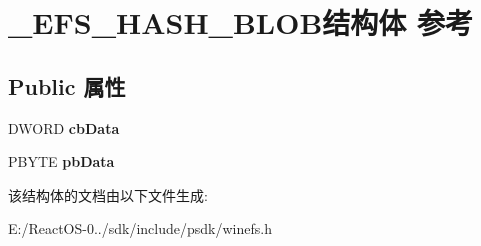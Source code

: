\hypertarget{struct___e_f_s___h_a_s_h___b_l_o_b}{}\section{\+\_\+\+E\+F\+S\+\_\+\+H\+A\+S\+H\+\_\+\+B\+L\+O\+B结构体 参考}
\label{struct___e_f_s___h_a_s_h___b_l_o_b}
\subsection*{Public 属性}
\begin{DoxyCompactItemize}
\item 
\mbox{\label{struct___e_f_s___h_a_s_h___b_l_o_b_a8102859e5b03d7732ab7bc9dc3bb27d9}} 
D\+W\+O\+RD {\bfseries cb\+Data}
\item 
\mbox{\label{struct___e_f_s___h_a_s_h___b_l_o_b_aa8ede8417a3f45eaae9f4658e2e74aba}} 
P\+B\+Y\+TE {\bfseries pb\+Data}
\end{DoxyCompactItemize}


该结构体的文档由以下文件生成\+:\begin{DoxyCompactItemize}
\item 
E\+:/\+React\+O\+S-\/0../sdk/include/psdk/winefs.\+h\end{DoxyCompactItemize}
